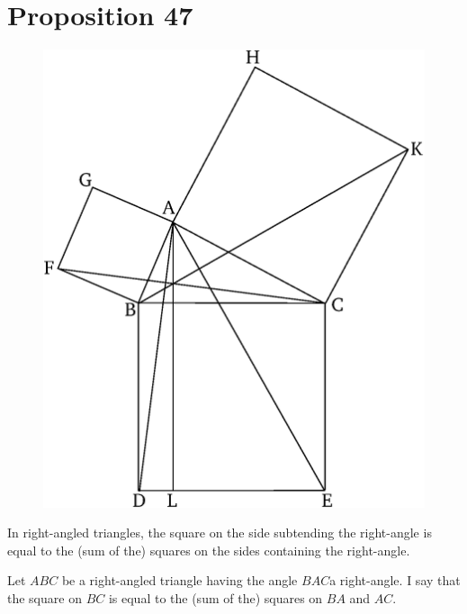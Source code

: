 \chapter*{Proposition 47}



\begin{figure}[ht]
    \begin{center}
    \includegraphics[width=0.5\linewidth]{figures/fig47e.eps}
    \label{fig:prop_47}
    \end{center}
\end{figure}

In right-angled triangles,  the square on the side subtending the right-angle
is equal to the (sum of the) squares on the sides containing the right-angle.

Let $ABC$ be a right-angled triangle having the angle $BAC$a right-angle. I say that the
square on $BC$ is equal to the (sum of the) squares on $BA$ and $AC$.

